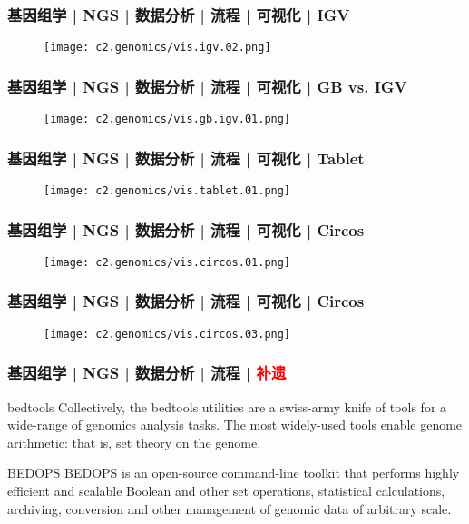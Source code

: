 \begin{frame}
  \frametitle{基因组学 | NGS | 数据分析 | 流程 | 可视化 | IGV}
  \begin{figure}
    \centering
    \texttt{[image: c2.genomics/vis.igv.02.png]}
  \end{figure}
\end{frame}

\begin{frame}
  \frametitle{基因组学 | NGS | 数据分析 | 流程 | 可视化 | GB vs. IGV}
  \begin{figure}
    \centering
    \texttt{[image: c2.genomics/vis.gb.igv.01.png]}
  \end{figure}
\end{frame}

\begin{frame}
  \frametitle{基因组学 | NGS | 数据分析 | 流程 | 可视化 | Tablet}
  \begin{figure}
    \centering
    \texttt{[image: c2.genomics/vis.tablet.01.png]}
  \end{figure}
\end{frame}

\begin{frame}
  \frametitle{基因组学 | NGS | 数据分析 | 流程 | 可视化 | Circos}
  \begin{figure}
    \centering
    \texttt{[image: c2.genomics/vis.circos.01.png]}
  \end{figure}
\end{frame}

\begin{frame}
  \frametitle{基因组学 | NGS | 数据分析 | 流程 | 可视化 | Circos}
  \begin{figure}
    \centering
    \texttt{[image: c2.genomics/vis.circos.03.png]}
  \end{figure}
\end{frame}

\begin{frame}
  \frametitle{基因组学 | NGS | 数据分析 | 流程 | \textcolor{red}{补遗}}
  \begin{block}{bedtools}
    Collectively, the bedtools utilities are a swiss-army knife of tools for a wide-range of genomics analysis tasks. The most widely-used tools enable genome arithmetic: that is, set theory on the genome.
  \end{block}
  \pause
  \begin{block}{BEDOPS}
    BEDOPS is an open-source command-line toolkit that performs highly efficient and scalable Boolean and other set operations, statistical calculations, archiving, conversion and other management of genomic data of arbitrary scale.
  \end{block}
\end{frame}

